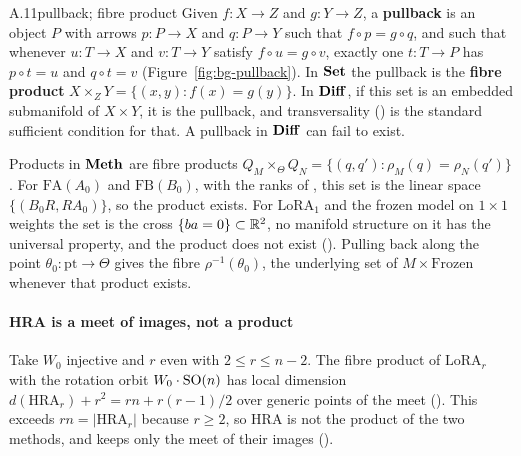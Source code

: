 
\begin{bgentry}{A.11}{pullback; fibre product}
Given $f:X\to Z$ and $g:Y\to Z$, a \textbf{pullback} is an object $P$ with arrows $p:P\to X$ and $q:P\to Y$ such that
$f\circ p=g\circ q$, and such that whenever $u:T\to X$ and $v:T\to Y$ satisfy $f\circ u=g\circ v$, exactly one
$t:T\to P$ has $p\circ t=u$ and $q\circ t=v$ (Figure~\ref{fig:bg-pullback}). In $\mathbf{Set}$ the pullback is the
\textbf{fibre product} $X\times_ZY=\{(x,y):f(x)=g(y)\}$. In $\mathbf{Diff}$, if this set is an embedded submanifold of
$X\times Y$, it is the pullback, and transversality () is the standard sufficient condition for that. A
pullback in $\mathbf{Diff}$ can fail to exist.
\end{bgentry}

Products in $\mathbf{Meth}$ are fibre products $Q_M\times_\Theta Q_N=\{(q,q'):\rho_M(q)=\rho_N(q')\}$. For $\mathrm{FA}(A_0)$
and $\mathrm{FB}(B_0)$, with the ranks of , this set is the linear space $\{(B_0R,RA_0)\}$, so the product
exists. For $\mathrm{LoRA}_1$ and the frozen model on $1\times1$ weights the set is the cross $\{ba=0\}\subset\mathbb{R}^2$, no
manifold structure on it has the universal property, and the product does not exist (). Pulling back along
the point $\theta_0:\mathrm{pt}\to\Theta$ gives the fibre $\rho^{-1}(\theta_0)$, the underlying set of
$M\times\text{Frozen}$ whenever that product exists.

\paragraph{HRA is a meet of images, not a product}
Take $W_0$ injective and $r$ even with $2\le r\le n-2$. The fibre product of $\mathrm{LoRA}_r$ with the rotation orbit
$W_0\cdot\mathrm{SO}(n)$ has local dimension $d(\mathrm{HRA}_r)+r^2=rn+r(r-1)/2$ over generic points of the meet
(). This exceeds $rn=\lvert\mathrm{HRA}_r\rvert$ because $r\ge2$, so HRA \citep{yuan2024bridging} is not the
product of the two methods, and  keeps only the meet of their images ().

